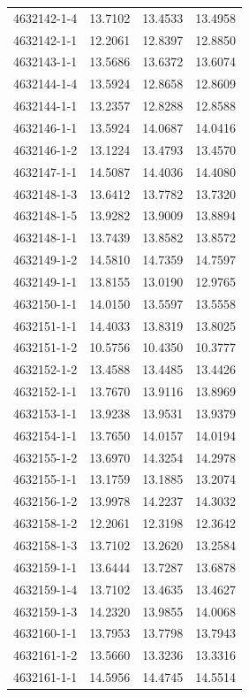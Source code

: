 \begin{longtable}{lrrr}
4632142-1-4 & 13.7102 & 13.4533 & 13.4958 \\
4632142-1-1 & 12.2061 & 12.8397 & 12.8850 \\
4632143-1-1 & 13.5686 & 13.6372 & 13.6074 \\
4632144-1-4 & 13.5924 & 12.8658 & 12.8609 \\
4632144-1-1 & 13.2357 & 12.8288 & 12.8588 \\
4632146-1-1 & 13.5924 & 14.0687 & 14.0416 \\
4632146-1-2 & 13.1224 & 13.4793 & 13.4570 \\
4632147-1-1 & 14.5087 & 14.4036 & 14.4080 \\
4632148-1-3 & 13.6412 & 13.7782 & 13.7320 \\
4632148-1-5 & 13.9282 & 13.9009 & 13.8894 \\
4632148-1-1 & 13.7439 & 13.8582 & 13.8572 \\
4632149-1-2 & 14.5810 & 14.7359 & 14.7597 \\
4632149-1-1 & 13.8155 & 13.0190 & 12.9765 \\
4632150-1-1 & 14.0150 & 13.5597 & 13.5558 \\
4632151-1-1 & 14.4033 & 13.8319 & 13.8025 \\
4632151-1-2 & 10.5756 & 10.4350 & 10.3777 \\
4632152-1-2 & 13.4588 & 13.4485 & 13.4426 \\
4632152-1-1 & 13.7670 & 13.9116 & 13.8969 \\
4632153-1-1 & 13.9238 & 13.9531 & 13.9379 \\
4632154-1-1 & 13.7650 & 14.0157 & 14.0194 \\
4632155-1-2 & 13.6970 & 14.3254 & 14.2978 \\
4632155-1-1 & 13.1759 & 13.1885 & 13.2074 \\
4632156-1-2 & 13.9978 & 14.2237 & 14.3032 \\
4632158-1-2 & 12.2061 & 12.3198 & 12.3642 \\
4632158-1-3 & 13.7102 & 13.2620 & 13.2584 \\
4632159-1-1 & 13.6444 & 13.7287 & 13.6878 \\
4632159-1-4 & 13.7102 & 13.4635 & 13.4627 \\
4632159-1-3 & 14.2320 & 13.9855 & 14.0068 \\
4632160-1-1 & 13.7953 & 13.7798 & 13.7943 \\
4632161-1-2 & 13.5660 & 13.3236 & 13.3316 \\
4632161-1-1 & 14.5956 & 14.4745 & 14.5514 \\

\end{longtable}
